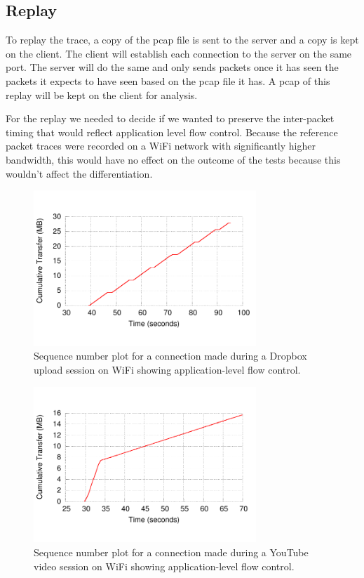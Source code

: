 \documentclass[letterpaper]{sig-alternate-10pt}
\begin{document}
\subsection{Replay}

To replay the trace, a copy of the pcap file is sent to the server and a copy is kept on the client. The client will establish each connection to the server on the same port. The server will do the same and only sends packets once it has seen the packets it expects to have seen based on the pcap file it has. A pcap of this replay will be kept on the client for analysis.

For the replay we needed to decide if we wanted to preserve the inter-packet timing that would reflect application level flow control. Because the reference packet traces were recorded on a WiFi network with significantly higher bandwidth, this would have no effect on the outcome of the tests because this wouldn't affect the differentiation.

\begin{figure}[ht]
\centering
\includegraphics[width=3.3in]{figures/db_big_u}
\caption{Sequence number plot for a connection made during a Dropbox upload session on WiFi showing application-level flow control.}
\label{fig:dbu}
\end{figure}


\begin{figure}[ht]
\centering
\includegraphics[width=3.3in]{figures/ytd}
\caption{Sequence number plot for a connection made during a YouTube video session on WiFi showing application-level flow control.}
\label{fig:dbu}
\end{figure}
\end{document}
